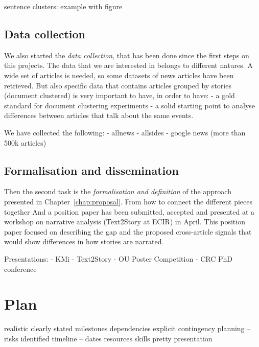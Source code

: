 sentence clusters: example with figure




\subsection{Data collection}
We also started the \emph{data collection}, that has been done since the first steps on this projects.
The data that we are interested in belongs to different natures.
A wide set of articles is needed, so some datasets of news articles have been retrieved.
But also specific data that contains articles grouped by stories (document clustered) is very important to have, in order to have:
- a gold standard for document clustering experiments
- a solid starting point to analyse differences between articles that talk about the same events.

We have collected the following:
- allnews
- allsides
- google news (more than 500k articles)

\subsection{Formalisation and dissemination}
Then the second task is the \emph{formalisation and definition} of the approach presented in Chapter~\ref{chap:proposal}.
From how to connect the different pieces together
And a position paper has been submitted, accepted and presented at a workshop on narrative analysis (Text2Story at ECIR) in April.
This position paper focused on describing the gap and the proposed cross-article signals that would show differences in how stories are narrated.

Presentations:
- KMi
- Text2Story
- OU Poster Competition
- CRC PhD conference






\section{Plan}

realistic
clearly stated milestones
dependencies explicit
contingency planning – risks identified
timeline – dates
resources
skills
pretty presentation

